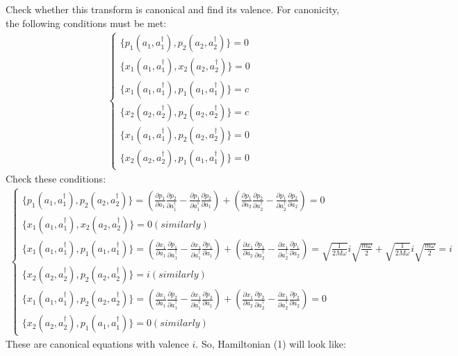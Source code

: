 \documentclass[]{article}
\begin{document}
Check whether this transform is canonical and find its valence.
For canonicity, the following conditions must be met:
\begin{align*}
	\begin{cases}
		\{p_1(a_1, a^\dag_1), p_2(a_2, a^\dag_2)\}=0
		\\
		\{x_1(a_1, a^\dag_1), x_2(a_2, a^\dag_2)\}=0
		\\
		\{x_1(a_1, a^\dag_1), p_1(a_1, a^\dag_1)\}=c
		\\
		\{x_2(a_2, a^\dag_2), p_2(a_2, a^\dag_2)\}=c
		\\
		\{x_1(a_1, a^\dag_1), p_2(a_2, a^\dag_2)\}=0
		\\
		\{x_2(a_2, a^\dag_2), p_1(a_1, a^\dag_1)\}=0
	\end{cases}
\end{align*}
Check these conditions:
\begin{align*}
	\begin{cases}
		\{p_1(a_1, a^\dag_1), p_2(a_2, a^\dag_2)\}=\left(\frac{\partial p_1}{\partial a_1} \frac{\partial p_2}{\partial a_1^\dag} - \frac{\partial p_1}{\partial a_1^\dag} \frac{\partial p_2}{\partial a_1}\right) + \left(\frac{\partial p_1}{\partial a_2} \frac{\partial p_2}{\partial a_2^\dag} - \frac{\partial p_1}{\partial a_2^\dag} \frac{\partial p_2}{\partial a_2} \right)=0
		\\
		\{x_1(a_1, a^\dag_1), x_2(a_2, a^\dag_2)\}=0 (similarly)
		\\
		\{x_1(a_1, a^\dag_1), p_1(a_1, a^\dag_1)\}=\left(\frac{\partial x_1}{\partial a_1} \frac{\partial p_1}{\partial a_1^\dag} - \frac{\partial x_1}{\partial a_1^\dag} \frac{\partial p_1}{\partial a_1}\right) + \left(\frac{\partial x_1}{\partial a_2} \frac{\partial p_1}{\partial a_2^\dag} - \frac{\partial x_1}{\partial a_2^\dag} \frac{\partial p_1}{\partial a_2} \right) = \sqrt{\frac{1}{2M \omega}} i \sqrt{\frac{m \omega}{2}}+\sqrt{\frac{1}{2M \omega}} i \sqrt{\frac{m \omega}{2}}=i
		\\
		\{x_2(a_2, a^\dag_2), p_2(a_2, a^\dag_2)\}=i (similarly) 
		\\
		\{x_1(a_1, a^\dag_1), p_2(a_2, a^\dag_2)\}=\left(\frac{\partial x_1}{\partial a_1} \frac{\partial p_2}{\partial a_1^\dag} - \frac{\partial x_1}{\partial a_1^\dag} \frac{\partial p_2}{\partial a_1}\right) + \left(\frac{\partial x_1}{\partial a_2} \frac{\partial p_2}{\partial a_2^\dag} - \frac{\partial x_1}{\partial a_2^\dag} \frac{\partial p_2}{\partial a_2} \right)=0
		\\
		\{x_2(a_2, a^\dag_2), p_1(a_1, a^\dag_1)\}=0 (similarly)
	\end{cases}
\end{align*}
These are canonical equations with valence $i$.
So, Hamiltonian (1) will look like:
\end{document}

